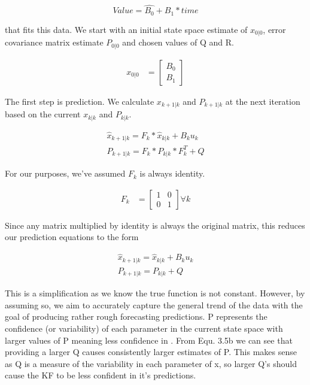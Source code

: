 \begin{equation} Value = \hat{B_{0}} + \hat{B_{1}}*time  \end{equation}

that fits this data. We start with an initial state space estimate of $x_{0|0}$, error covariance matrix estimate $P_{0|0}$ and chosen values of Q and R.

\begin{align}
    x_{0|0} &= \begin{bmatrix}
           B_{0} \\
           B_{1}
         \end{bmatrix}
  \end{align}
  
  The first step is prediction. We calculate $x_{k+1|k}$ and $P_{k+1|k}$ at the next iteration based on the current $x_{k|k}$ and $P_{k|k}$.
  
  \begin{subequations}
  \begin{align}
  \hat{x}_{k+1|k} = F_{k}* \hat{x}_{k|k}+B_{k}u_{k}   \\
  P_{k+1|k} = F_{k}* P_{k|k}*F_{k}^{T}+Q
  \end{align}
  \end{subequations}
  
  For our purposes, we've assumed $F_{k}$ is always identity.
  
  \begin{align}
    F_{k} &= \begin{bmatrix}
           1&0 \\
           0&1
         \end{bmatrix}
         \forall k
  \end{align}
  
  Since any matrix multiplied by identity is always the original matrix, this reduces our prediction equations to the form
  
  \begin{subequations}
  \begin{align}
  \hat{x}_{k+1|k} = \hat{x}_{k|k}+B_{k}u_{k}   \\
  P_{k+1|k} = P_{k|k}+Q
  \end{align}
  \end{subequations}
  
  This is a simplification as we know the true function is not constant. However, by assuming so, we aim to accurately capture the general trend of the data with the goal of producing rather rough forecasting predictions. P represents the confidence (or variability) of each parameter in the current state space with larger values of P meaning less confidence in . From Equ. 3.5b we can see that providing a larger Q causes consistently larger estimates of P. This makes sense as Q is a measure of the variability in each parameter of x, so larger Q's should cause the KF to be less confident in it's predictions.
  
